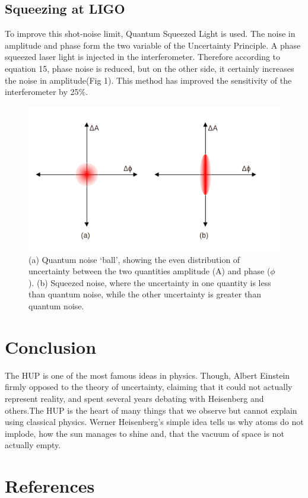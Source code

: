 \documentclass[conference]{IEEEtran}
\begin{document}
\subsection*{Squeezing at LIGO}

To improve this shot-noise limit, Quantum Squeezed Light is used. The noise in amplitude and phase form the two variable of the Uncertainty Principle. A phase squeezed laser light is injected in the interferometer. Therefore according to equation 15, phase noise is reduced, but on the other side, it certainly increases the noise in amplitude(Fig 1). This method has improved the sensitivity of the interferometer by 25$\%$\cite{6988398}.

\begin{figure}[htbp]
\centerline{\includegraphics[scale=0.3]{Untitled_1.png}}
\caption{ (a) Quantum noise ‘ball’, showing the even distribution of uncertainty between the two quantities amplitude (A) and phase ($\phi$). (b) Squeezed noise, where the uncertainty in one quantity is less than quantum noise, while the other uncertainty is greater than quantum noise.}
\label{fig}
\end{figure}

\section{Conclusion}

The HUP is one of the most famous ideas in physics. Though, Albert Einstein firmly opposed to the theory of uncertainty, claiming that it could not actually represent reality, and spent several years debating with Heisenberg and others.The HUP is the heart of many things that we observe but cannot explain using classical physics. Werner Heisenberg's simple idea tells us why atoms do not implode, how the sun manages to shine and, that the vacuum of space is not actually empty. 


\section{References}
\printbibliography[heading=none]
\end{document}
